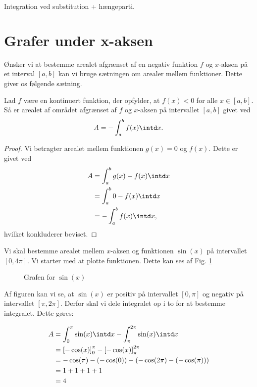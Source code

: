 
\begin{center}
\Huge
Integration ved substitution + hængeparti. 
\end{center}

\section*{Grafer under x-aksen}

Ønsker vi at bestemme arealet afgrænset af en negativ funktion $f$ og $x$-aksen på et interval $[a,b]$ kan vi bruge sætningen om arealer mellem funktioner. Dette giver os følgende sætning.
\begin{setn}
Lad $f$ være en kontinuert funktion, der opfylder, at $f(x)<0$ for alle $x\in [a,b]$. Så er arealet af området afgrænset af $f$ og $x$-aksen på intervallet $[a,b]$ givet ved 
\begin{align*}
A = -\int_a^bf(x)\intd x.
\end{align*}
\end{setn}
\begin{proof}
Vi betragter arealet mellem funktionen $g(x) = 0$ og $f(x)$. Dette er givet ved
\begin{align*}
A &= \int_a^b g(x)-f(x)\intd x\\
&= \int_a^b0-f(x)\intd x \\
&= -\int_a^bf(x)\intd x,
\end{align*}
hvilket konkluderer beviset.
\end{proof}

\begin{exa}
Vi skal bestemme arealet mellem $x$-aksen og funktionen $\sin(x)$ på intervallet $[0,4\pi]$. Vi starter med at plotte funktionen. Dette kan ses af Fig. \ref{fig:sin}
\begin{figure}[H]
\centering
{}
\caption{Grafen for $\sin(x)$}
\label{fig:sin}
\end{figure}
Af figuren kan vi se, at $\sin(x)$ er positiv på intervallet $[0,\pi]$ og negativ på intervallet $[\pi,2\pi]$. Derfor skal vi dele integralet op i to for at bestemme integralet. Dette gøres:

\begin{align*}
A &= \int_0^\pi \sin(x) \intd x - \int_\pi^{2\pi}\sin(x)\intd x \\
&= \left[-\cos(x)\right]_0^\pi - \left[-\cos(x)\right]_\pi^{2\pi}\\
&= -\cos(\pi)-(-\cos(0)) - (-\cos(2\pi) -(-\cos(\pi)))\\
&= 1 + 1 + 1 + 1\\
&= 4
\end{align*}
\end{exa}

